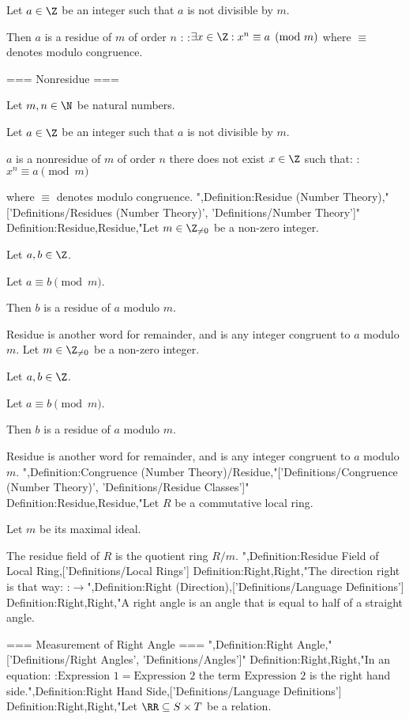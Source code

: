 Let $a \in \Z$ be an integer such that $a$ is not divisible by $m$.

Then $a$ is a residue of $m$ of order $n$ :
:$\exists x \in \Z: x^n \equiv a \pmod m$
where $\equiv$ denotes modulo congruence.


=== Nonresidue ===

Let $m, n \in \N$ be natural numbers.

Let $a \in \Z$ be an integer such that $a$ is not divisible by $m$.


$a$ is a nonresidue of $m$ of order $n$  there does not exist $x \in \Z$ such that:
:$x^n \equiv a \pmod m$

where $\equiv$ denotes modulo congruence.
",Definition:Residue (Number Theory),"['Definitions/Residues (Number Theory)', 'Definitions/Number Theory']"
Definition:Residue,Residue,"Let $m \in \Z_{\ne 0}$ be a non-zero integer.

Let $a, b \in \Z$.

Let $a \equiv b \pmod m$.


Then $b$ is a residue of $a$ modulo $m$.

Residue is another word for remainder, and is any integer congruent to $a$ modulo $m$.
Let $m \in \Z_{\ne 0}$ be a non-zero integer.

Let $a, b \in \Z$.

Let $a \equiv b \pmod m$.


Then $b$ is a residue of $a$ modulo $m$.

Residue is another word for remainder, and is any integer congruent to $a$ modulo $m$.
",Definition:Congruence (Number Theory)/Residue,"['Definitions/Congruence (Number Theory)', 'Definitions/Residue Classes']"
Definition:Residue,Residue,"Let $R$ be a commutative local ring.

Let $m$ be its maximal ideal.


The residue field of $R$ is the quotient ring $R / m$.
",Definition:Residue Field of Local Ring,['Definitions/Local Rings']
Definition:Right,Right,"The direction right is that way:
:$\to$",Definition:Right (Direction),['Definitions/Language Definitions']
Definition:Right,Right,"A right angle is an angle that is equal to half of a straight angle.


=== Measurement of Right Angle ===
",Definition:Right Angle,"['Definitions/Right Angles', 'Definitions/Angles']"
Definition:Right,Right,"In an equation:
:$\text {Expression $1$} = \text {Expression $2$}$
the term $\text {Expression $2$}$ is the right hand side.",Definition:Right Hand Side,['Definitions/Language Definitions']
Definition:Right,Right,"Let $\RR \subseteq S \times T$ be a relation.


